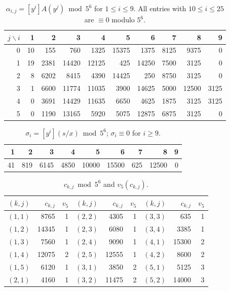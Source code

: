 \documentclass[11pt]{article}
\theoremstyle{definition}
\theoremstyle{remark}
\numberwithin{equation}{section}
\begin{document}
\begin{table}[H]
\centering\small
\caption{$\alpha_{i,j}=[y^i]A(y^j)\bmod5^6$ for $1\le i\le9$. All entries with $10\le i\le25$ are $\equiv0$ modulo $5^6$.}\label{tab:alpha}
\begin{tabular}{r|rrrrrrrrr}
$j\backslash i$ & 1&2&3&4&5&6&7&8&9\\\hline
0 & 10 & 155 & 760 & 1325 & 15375 & 1375 & 8125 & 9375 & 0 \\
1 & 19 & 2381 & 14420 & 12125 & 425 & 14250 & 7500 & 3125 & 0 \\
2 & 8 & 6202 & 8415 & 4390 & 14425 & 250 & 8750 & 3125 & 0 \\
3 & 1 & 6600 & 11774 & 11035 & 3900 & 14625 & 5000 & 12500 & 3125 \\
4 & 0 & 3691 & 14429 & 11635 & 6650 & 4625 & 1875 & 3125 & 3125 \\
5 & 0 & 1190 & 13165 & 5920 & 5075 & 12875 & 6875 & 3125 & 0 \\
\end{tabular}
\end{table}

\begin{table}[H]
\centering\small
\caption{$\sigma_i=[y^i](s/x)\bmod 5^6$; $\sigma_i\equiv0$ for $i\ge9$.}\label{tab:sigma}
\begin{tabular}{rrrrrrrrr}
1&2&3&4&5&6&7&8&9\\\hline
41 & 819 & 6145 & 4850 & 10000 & 15500 & 625 & 12500 & 0 \\
\end{tabular}
\end{table}

\begin{table}[H]
\centering\small
\caption{$c_{k,j}\bmod 5^6$ and $v_5(c_{k,j})$.}\label{tab:c}
\begin{tabular}{rrr@{\qquad}rrr@{\qquad}rrr}
$(k,j)$ & $c_{k,j}$ & $v_5$ & $(k,j)$ & $c_{k,j}$ & $v_5$ & $(k,j)$ & $c_{k,j}$ & $v_5$\\\hline
$(1,1)$ & 8765 & 1 & $(2,2)$ & 4305 & 1 & $(3,3)$ & 635 & 1 \\
$(1,2)$ & 14345 & 1 & $(2,3)$ & 6080 & 1 & $(3,4)$ & 3385 & 1 \\
$(1,3)$ & 7560 & 1 & $(2,4)$ & 9090 & 1 & $(4,1)$ & 15300 & 2 \\
$(1,4)$ & 12075 & 2 & $(2,5)$ & 12555 & 1 & $(4,2)$ & 8600 & 2 \\
$(1,5)$ & 6120 & 1 & $(3,1)$ & 3850 & 2 & $(5,1)$ & 5125 & 3 \\
$(2,1)$ & 4160 & 1 & $(3,2)$ & 11475 & 2 & $(5,2)$ & 14000 & 3 \\
\end{tabular}
\end{table}
\end{document}
